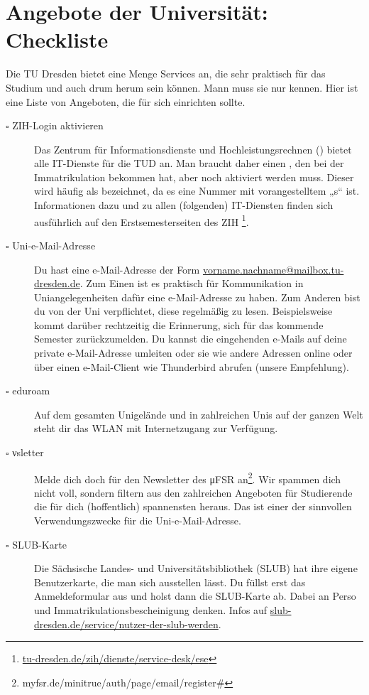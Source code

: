 \documentclass{scrartcl}
\begin{document}
\section{Angebote der Universität: Checkliste}
\label{sec:angebote_der_universitat}
Die TU Dresden bietet eine Menge Services an, die sehr praktisch für das Studium und auch drum herum sein können.
Mann muss sie nur kennen. Hier ist eine Liste von Angeboten, die für sich einrichten sollte.
\newcommand{\clitem}[1]{\item[$\square$ #1]}
\begin{description}
  \clitem{ZIH-Login aktivieren} Das Zentrum für Informationsdienste und Hochleistungsrechnen ()
    bietet alle IT-Dienste für die TUD an. Man braucht daher einen , den bei der
    Immatrikulation bekommen hat, aber noch aktiviert werden muss.
    Dieser wird häufig als  bezeichnet, da es eine Nummer mit vorangestelltem „s“ ist.
    Informationen dazu und zu allen (folgenden) IT-Diensten finden sich ausführlich auf den Erstsemesterseiten des ZIH \footnote{\url{tu-dresden.de/zih/dienste/service-desk/ese}\label{zihurl}}.
    \clitem{Uni-e-Mail-Adresse} Du hast eine e-Mail-Adresse der Form \url{vorname.nachname@mailbox.tu-dresden.de}.
    Zum Einen ist es praktisch für Kommunikation in Uniangelegenheiten dafür eine e-Mail-Adresse zu haben.
    Zum Anderen bist du von der Uni verpflichtet, diese regelmäßig zu lesen.
    Beispielsweise kommt darüber rechtzeitig die Erinnerung, sich für das kommende Semester zurückzumelden.
    Du kannst die eingehenden e-Mails auf deine private e-Mail-Adresse umleiten oder sie wie andere Adressen
    online oder über einen e-Mail-Client wie Thunderbird abrufen (unsere Empfehlung).
  \clitem{eduroam} Auf dem gesamten Unigelände und in zahlreichen Unis auf der ganzen Welt steht dir
    das WLAN  mit Internetzugang zur Verfügung.
    \clitem{νsletter} Melde dich doch für den Newsletter des μFSR an\footnote{myfsr.de/minitrue/auth/page/email/register#}.
    Wir spammen dich nicht voll, sondern
    filtern aus den zahlreichen Angeboten für Studierende die für dich (hoffentlich) spannensten heraus.
    Das ist einer der sinnvollen Verwendungszwecke für die Uni-e-Mail-Adresse.
  \clitem{SLUB-Karte} Die Sächsische Landes- und Universitätsbibliothek (SLUB) hat ihre eigene Benutzerkarte,
    die man sich ausstellen lässt. Du füllst erst das Anmeldeformular aus und holst dann die SLUB-Karte ab. Dabei an Perso und Immatrikulationsbescheinigung denken. Infos auf \url{slub-dresden.de/service/nutzer-der-slub-werden}.

\end{description}
\end{document}
